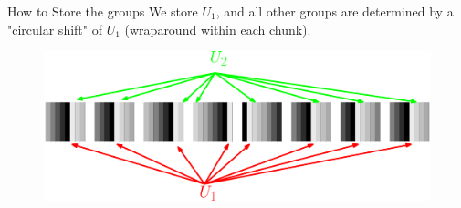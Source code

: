 \documentclass[table,serif,mathserif,final]{beamer}
\theoremstyle{remark}
\begin{document}
\begin{frame}{}
\begin{columns}[t]
\begin{column}{0.5\linewidth}
\begin{block}{How to Store the groups}
	\vspace{0.5cm}
	We store $U_1$, and all other groups are determined by a "circular shift" of $U_1$ (wraparound within each chunk).
	\vspace{0.5cm}
	\begin{figure}
		\includegraphics[width=\linewidth]{imgs/blackrainbowAlt.eps}
	\end{figure}	
\end{block}
\end{column}

\end{columns}
\end{frame}
\end{document}
